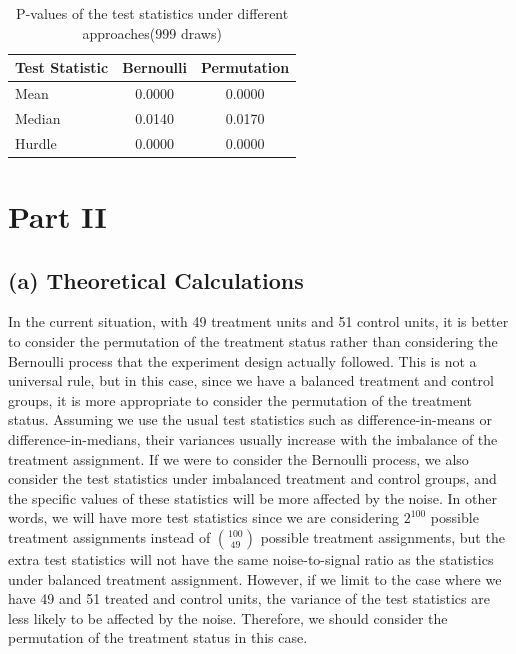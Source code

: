 \documentclass[11pt]{article}
\numberwithin{equation}{section}
\begin{document}
\begin{table}[h]
    \centering
    \begin{tabular}{lcc}
        \toprule
        Test Statistic & Bernoulli & Permutation \\
        \midrule
        Mean & 0.0000 & 0.0000 \\
        Median & 0.0140 & 0.0170 \\
        Hurdle & 0.0000 & 0.0000 \\
        \bottomrule
    \end{tabular}
    \caption{\label{tab:p_values_bernoulli}P-values of the test statistics under different approaches(999 draws)}
\end{table}


\section{Part II}
\label{sec:part_ii}
\subsection*{(a) Theoretical Calculations}

In the current situation, with 49 treatment units and 51 control units, it is better to consider the permutation of the treatment status rather than considering the Bernoulli process that the experiment design actually followed.
This is not a universal rule, but in this case, since we have a balanced treatment and control groups, it is more appropriate to consider the permutation of the treatment status.
Assuming we use the usual test statistics such as difference-in-means or difference-in-medians, their variances usually increase with the imbalance of the treatment assignment.
If we were to consider the Bernoulli process, we also consider the test statistics under imbalanced treatment and control groups, and the specific values of these statistics will be more affected by the noise.
In other words, we will have more test statistics since we are considering $2^{100}$ possible treatment assignments instead of $\binom{100}{49}$ possible treatment assignments, but the extra test statistics will not have the same noise-to-signal ratio as the statistics under balanced treatment assignment.
However, if we limit to the case where we have 49 and 51 treated and control units, the variance of the test statistics are less likely to be affected by the noise.
Therefore, we should consider the permutation of the treatment status in this case.
\end{document}

